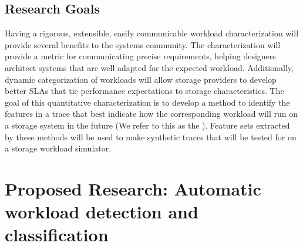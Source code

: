 \subsection{Research Goals}
Having a rigorous, extensible, easily communicable workload characterization
will provide several benefits to the systems community. The characterization
will provide a metric for communicating precise requirements, helping
designers architect systems that are well adapted for the expected workload.
Additionally, dynamic categorization of workloads will allow storage providers
to develop better SLAs that tie performance expectations to storage
characteristics. 
The goal of this quantitative characterization is to develop a method to
identify the features in a trace that best indicate how the corresponding
workload will run on a storage system in the future (We refer to this as the \systemfit).
Feature sets extracted by these methods will be used to make synthetic traces
that will be tested for \systemfit on a storage workload simulator.
%

\section{Proposed Research: Automatic workload detection and classification}%

